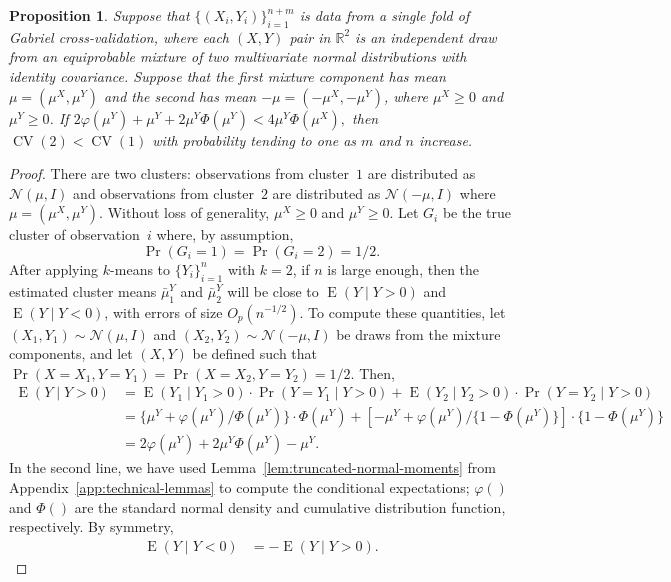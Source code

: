 \documentclass[12pt]{article}
\newtheorem{proposition}{Proposition}
\newcommand{\CV}{\operatorname{CV}}
\newcommand{\E}{\operatorname{E}}
\newcommand{\OhP}{O_p}
\newcommand{\R}{\mathbb{R}}
\newcommand{\muX}{\mu^{X}}
\newcommand{\muY}{\mu^{Y}}
\begin{document}
\begin{proposition}\label{prop:twoclust}
Suppose that $\{(X_i,Y_i)\}_{i=1}^{n+m}$ is data from a single fold of Gabriel
cross-validation, where each $(X,Y)$ pair in $\R^2$ is an independent draw
from an equiprobable mixture of two multivariate normal distributions with
identity covariance. Suppose that the first mixture component has mean
$\mu = (\muX, \muY)$ and the second has mean $-\mu = (-\muX, -\muY)$,
where $\muX \geq 0$ and $\muY \geq 0$. 
If 
\(
  2 \varphi(\muY) + \muY + 2 \muY \Phi(\muY) < 4 \muY \Phi(\muX),
\)
then $\CV(2) < \CV(1)$ with probability tending to one as $m$ and $n$ increase.
\end{proposition}

\begin{proof}
There are two clusters: observations from cluster~$1$ are distributed as
\(
  \mathcal{N}(\mu, I)
\)
and observations from cluster~$2$ are distributed as
\(
\mathcal{N}(-\mu, I)
\)
where $\mu = (\muX, \muY)$.  Without loss of generality, $\muX \geq 0$ and
$\muY \geq 0$.  Let $G_i$ be the true cluster of observation~$i$
where, by assumption,
\[
  \Pr(G_i=1) = \Pr(G_i=2) = 1/2.
\]
After applying $k$-means to $\{ Y_i\}_{i=1}^{n}$ with $k=2$, if $n$ is large
enough, then the estimated cluster means $\bar{\mu}^Y_1$ and $\bar{\mu}^Y_2$
will be close to $\E(Y \mid Y>0)$ and $\E(Y \mid Y < 0)$, with errors of
size $\OhP(n^{-1/2})$. To compute these quantities, let
$(X_1, Y_1) \sim \mathcal{N}(\mu, I)$ and $(X_2, Y_2) \sim \mathcal{N}(-\mu, I)$
be draws from the mixture components, and let $(X,Y)$ be defined such that
$\Pr(X= X_1, Y = Y_1) = \Pr(X= X_2, Y = Y_2) = 1/2$. Then,
\begin{align*}
  \E(Y \mid Y>0)
  &= \E(Y_1 \mid Y_1 > 0) \cdot \Pr(Y = Y_1 \mid Y >0)
   + \E(Y_2 \mid Y_2 > 0) \cdot \Pr(Y = Y_2 \mid Y > 0)
\\
&=  \{ \muY + \varphi(\muY) / \Phi(\muY) \} \cdot \Phi(\muY)
+ [-\muY + \varphi(\muY) / \{ 1 - \Phi(\muY) \}] \cdot \{ 1 - \Phi(\muY) \}
\\
  &= 2\varphi(\muY)+ 2\muY\Phi(\muY)- \muY. 
\end{align*}
In the second line, we have used
Lemma~\ref{lem:truncated-normal-moments} from
Appendix~\ref{app:technical-lemmas} to compute the conditional expectations;
$\varphi()$ and $\Phi()$ are the standard normal density and
cumulative distribution function, respectively. By symmetry,
\begin{align*}
  \E(Y \mid Y<0) &= -\E(Y \mid Y > 0).
\end{align*}



\end{proof}
\end{document}
